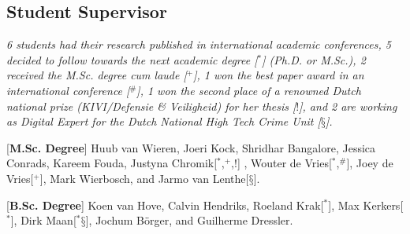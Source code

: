 \documentclass[print]{styles/friggeri-cv-linux} %
\begin{document}
\subsection{Student Supervisor}\vspace{-5pt}

\textit{6 students had their research published in
international academic conferences, 5 decided to follow towards the next
academic degree [$^*$] (Ph.D. or M.Sc.), 2 received the M.Sc. degree
\textit{cum laude} [$^+$], 1 won the best paper award in an international
conference [$^\#$], 1 won the second place of a renowned Dutch national
prize (KIVI/Defensie \& Veiligheid) for her thesis [$!$], and 2 are working as Digital Expert for the Dutch National High Tech Crime Unit [$§$].}

\begin{entrylist}
\vspace{-0.3cm}
\entry
{[\textbf{M.Sc. Degree}]}
{\textnormal{Huub van Wieren, Joeri Kock, Shridhar Bangalore, Jessica Conrads, Kareem Fouda, Justyna Chromik[$^*$,$^+$,$!$] , Wouter de Vries[$^*$,$^\#$], Joey de Vries[$^+$], Mark Wierbosch, and Jarmo van Lenthe[$§$].}}
{}

\vspace{-0.3cm}
\entry
{[\textbf{B.Sc. Degree}]}
{\textnormal{Koen van Hove, Calvin Hendriks, Roeland Krak[$^*$], Max Kerkers[$^*$], Dirk Maan[$^*§$], Jochum Börger, and Guilherme Dressler.}} 
{}

\end{entrylist}


\end{document}
